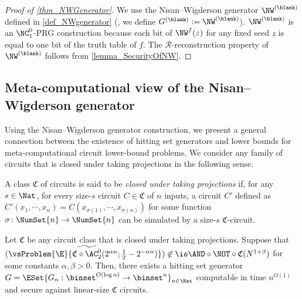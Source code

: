 \documentclass{toc}
\begin{document}
\begin{proof}
  [Proof of \cref{thm_NWGenerator}]
  We use the Nisan--Wigderson generator $\NW^{(\blank)}$ defined in \cref{def_NWgenerator} (\ie, we define $G^{(\blank)} := \NW^{(\blank)}$).
  $\NW^{(\blank)}$ is an $\NC^0_1$-PRG construction because each bit of $\NW^{f}(z)$ for any fixed seed $z$
  is equal to one bit of the truth table of $f$.
  The $\mathcal{R}$-reconstruction property of $\NW^{(\blank)}$ follows from \cref{lemma_SecurityOfNW}.
\end{proof}


\subsection{Meta-computational view of the Nisan--Wigderson generator}
\label{section_GeneralNW}

Using the Nisan--Wigderson generator construction,
we present a general connection between the existence of hitting set generators
and lower bounds for meta-computational circuit lower-bound problems.
We consider any family of circuits that is closed under taking projections in the following sense.
\begin{definition}
  A class $\mathfrak{C}$ of circuits is said to be
  \emph{closed under taking projections}
  if, for any $s \in \Nat$,
  for every size-$s$ circuit $C \in \mathfrak{C}$ of $n$ inputs,
  a circuit $C'$ defined as $C'(x_1, \cdots, x_n) = C(x_{\sigma(1)}, \cdots, x_{\sigma(n)})$ for some function $\sigma \colon \NumSet{n} \to \NumSet{n}$
  can be simulated by a size-$s$ $\mathfrak{C}$-circuit.
\end{definition}

\begin{theorem}
  \label{thm_GeneralNW}
  Let $\mathfrak{C}$ be any circuit class that is closed under taking projections.
  Suppose that
  $(\vsProblem{\E}{\widetilde{\mathfrak{C} \circ \AC^0_2} (2^{\alpha n} ; \frac{1}{2} - 2^{- \alpha n})} ) \not\in \io \AND \circ \NOT \circ \mathfrak{C} (N^{1 + \beta})$
  for some constants $\alpha, \beta > 0$.
  Then,
  there exists a hitting set generator $G = \ESet{ G_n : \binset^{O(\log n)} \to \binset^n }_{n \in \Nat} $ computable in time $n^{O(1)}$ and secure against linear-size $\mathfrak{C}$ circuits.
\end{theorem}
\end{document}
